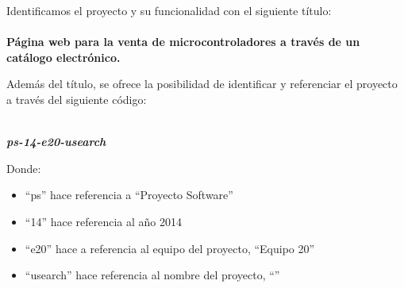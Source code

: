\noindent Identificamos el proyecto y su funcionalidad con el siguiente título:
\paragraph{}\textbf{\large \indent Página web para la venta de microcontroladores a través de un \newline \indent catálogo electrónico.}

\noindent \newline Además del título, se ofrece la posibilidad de identificar y referenciar el proyecto a través del siguiente código:
\begin{center}
	\textbf{\textit{\large \\ ps-14-e20-usearch}}
\end{center}
Donde:
	\begin{itemize}
	\renewcommand{\labelitemi}{$-$}
		\item ``ps'' hace referencia a ``Proyecto Software''
		\item ``14'' hace referencia al año 2014
		\item ``e20'' hace a referencia al equipo del proyecto, ``Equipo 20''
		\item ``usearch'' hace referencia al nombre del proyecto, ``\nombreDelProyecto''
	\end{itemize}